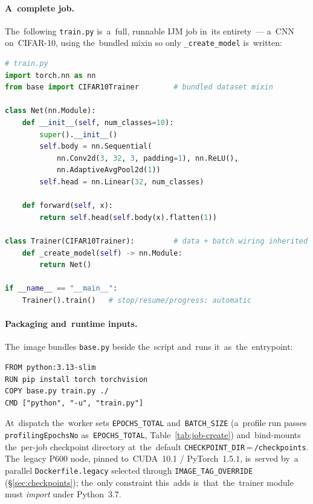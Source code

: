 \paragraph{A~complete job.}  The~following \texttt{train.py} is~a~full,
runnable IJM job in~its entirety~--- a~CNN on~CIFAR-10, using the~bundled
mixin so only \texttt{\_create\_model} is~written:

\begin{lstlisting}[language=Python, numbers=none]
# train.py
import torch.nn as nn
from base import CIFAR10Trainer        # bundled dataset mixin

class Net(nn.Module):
    def __init__(self, num_classes=10):
        super().__init__()
        self.body = nn.Sequential(
            nn.Conv2d(3, 32, 3, padding=1), nn.ReLU(),
            nn.AdaptiveAvgPool2d(1))
        self.head = nn.Linear(32, num_classes)

    def forward(self, x):
        return self.head(self.body(x).flatten(1))

class Trainer(CIFAR10Trainer):         # data + batch wiring inherited
    def _create_model(self) -> nn.Module:
        return Net()

if __name__ == "__main__":
    Trainer().train()   # stop/resume/progress: automatic
\end{lstlisting}

\paragraph{Packaging and~runtime inputs.}  The~image bundles \texttt{base.py}
beside the~script and~runs it~as~the~entrypoint:

\begin{lstlisting}[language={}, numbers=none]
FROM python:3.13-slim
RUN pip install torch torchvision
COPY base.py train.py ./
CMD ["python", "-u", "train.py"]
\end{lstlisting}

At~dispatch the~worker sets \texttt{EPOCHS\_TOTAL} and~\texttt{BATCH\_SIZE}
(a~profile run passes \texttt{profilingEpochsNo} as~\texttt{EPOCHS\_TOTAL},
Table~\ref{tab:job-create}) and~bind-mounts the~per-job checkpoint directory
at~the~default \texttt{CHECKPOINT\_DIR}\,=\,\texttt{/checkpoints}.
The~legacy P600 node, pinned to~CUDA~10.1 / PyTorch~1.5.1, is~served by~a
parallel \texttt{Dockerfile.legacy} selected through \texttt{IMAGE\_TAG\_OVERRIDE}
(\S\ref{sec:checkpoints}); the~only constraint this~adds is~that~the~trainer
module must \emph{import} under Python~3.7.

